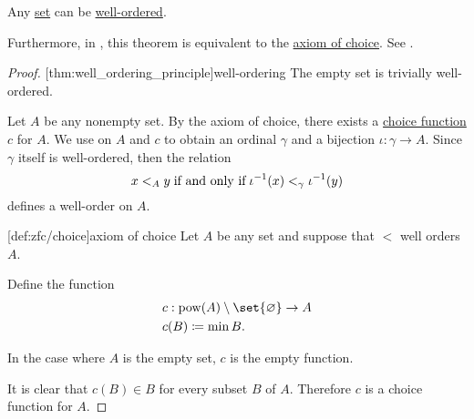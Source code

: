 \begin{theorem}\label{thm:well_ordering_principle}
  Any \hyperref[def:set]{set} can be \hyperref[def:well_ordered_set]{well-ordered}.

  Furthermore, in \hyperref[def:zfc]{}, this theorem is equivalent to the \hyperref[def:zfc/choice]{axiom of choice}. See .
\end{theorem}
\begin{proof}
  [thm:well_ordering_principle]{well-ordering} The empty set is trivially well-ordered.

  Let \( A \) be any nonempty set. By the axiom of choice, there exists a \hyperref[def:choice_function]{choice function} \( c \) for \( A \). We use  on \( A \) and \( c \) to obtain an ordinal \( \gamma \) and a bijection \( \iota: \gamma \to A \). Since \( \gamma \) itself is well-ordered, then the relation
  \begin{equation*}
    x <_A y \T{if and only if} \iota^{-1}(x) <_\gamma \iota^{-1}(y)
  \end{equation*}
  defines a well-order on \( A \).

  [def:zfc/choice]{axiom of choice} Let \( A \) be any set and suppose that \( < \) well orders \( A \).

  Define the function
  \begin{equation*}
    \begin{aligned}
      &c: \pow(A) \setminus \set{ \varnothing } \to A \\
      &c(B) \coloneqq \min B.
    \end{aligned}
  \end{equation*}

  In the case where \( A \) is the empty set, \( c \) is the empty function.

  It is clear that \( c(B) \in B \) for every subset \( B \) of \( A \). Therefore \( c \) is a choice function for \( A \).
\end{proof}

